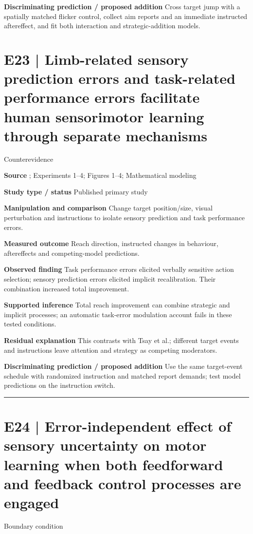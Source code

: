 \documentclass[11pt,a4paper]{article}
\begin{document}
\textbf{Discriminating prediction / proposed addition} Cross target jump with a spatially matched flicker control, collect aim reports and an immediate instructed aftereffect, and fit both interaction and strategic-addition models.\par
\clearpage\section{E23 | Limb-related sensory prediction errors and task-related performance errors facilitate human sensorimotor learning through separate mechanisms}
{\small\sffamily\color{navy} Counterevidence}\par
\textbf{Source} \cite{oza2024}; Experiments 1--4; Figures 1--4; Mathematical modeling\par
\textbf{Study type / status} Published primary study\par
\textbf{Manipulation and comparison} Change target position/size, visual perturbation and instructions to isolate sensory prediction and task performance errors.\par
\textbf{Measured outcome} Reach direction, instructed changes in behaviour, aftereffects and competing-model predictions.\par
\textbf{Observed finding} Task performance errors elicited verbally sensitive action selection; sensory prediction errors elicited implicit recalibration. Their combination increased total improvement.\par
\textbf{Supported inference} Total reach improvement can combine strategic and implicit processes; an automatic task-error modulation account fails in these tested conditions.\par
\textbf{Residual explanation} This contrasts with Tsay et al.; different target events and instructions leave attention and strategy as competing moderators.\par
\textbf{Discriminating prediction / proposed addition} Use the same target-event schedule with randomized instruction and matched report demands; test model predictions on the instruction switch.\par
\bigskip\hrule\medskip\section{E24 | Error-independent effect of sensory uncertainty on motor learning when both feedforward and feedback control processes are engaged}
{\small\sffamily\color{navy} Boundary condition}\par
\end{document}
